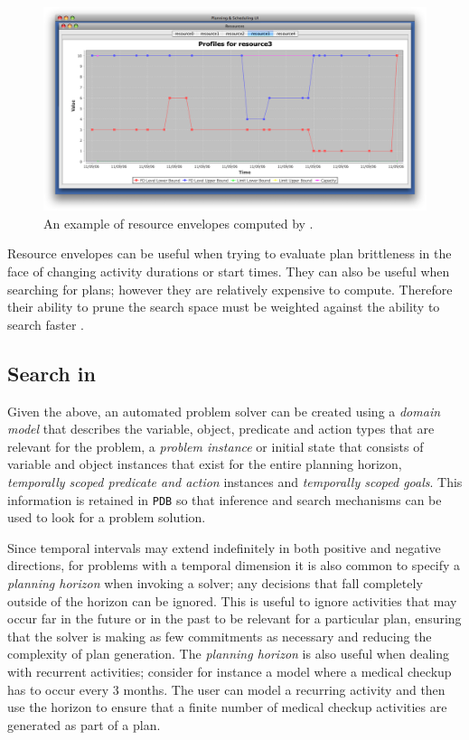 \begin{figure}
\centering
\includegraphics[scale=0.3]{figs/europa-resource-envelopes.png}
\caption{\small An example of resource envelopes computed by \eu.}
\label{fig:resenvelopes}
\end{figure}

Resource envelopes can be useful when trying to evaluate plan
brittleness in the face of changing activity durations or start
times. They can also be useful when searching for plans; however they
are relatively expensive to compute. Therefore their ability to prune
the search space must be weighted against the ability to search faster
\cite{6007772, morris11}.


\subsection{Search in \eu}
\label{sec:europa:search}

Given the above, an automated problem solver can be created using a
\emph{domain model} that describes the variable, object, predicate and
action types that are relevant for the problem, a \emph{problem
  instance} or initial state that consists of variable and object
instances that exist for the entire planning horizon, \emph{temporally
  scoped predicate and action} instances and \emph{temporally scoped
  goals}. This information is retained in \eus \texttt{PDB} so that
inference and search mechanisms can be used to look for a problem
solution.

Since temporal intervals may extend indefinitely in both positive and
negative directions, for problems with a temporal dimension it is also
common to specify a \emph{planning horizon} when invoking a solver;
any decisions that fall completely outside of the horizon can be
ignored. This is useful to ignore activities that may occur far in the
future or in the past to be relevant for a particular plan, ensuring
that the solver is making as few commitments as necessary and reducing
the complexity of plan generation.  The \emph{planning horizon} is
also useful when dealing with recurrent activities; consider for
instance a model where a medical checkup has to occur every $3$
months. The user can model a recurring activity and then use the
horizon to ensure that a finite number of medical checkup activities
are generated as part of a plan.

